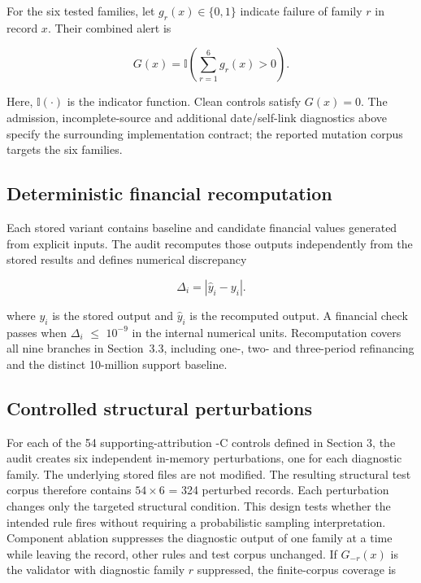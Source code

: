 \documentclass[11pt,a4paper]{article}
\begin{document}
For the six tested families, let $g_r(x)\in\{0,1\}$ indicate failure of family $r$ in record $x$. Their combined alert is

\begin{equation}\label{eq:validator}G(x)=\mathbb{I}\!\left(\sum_{r=1}^{6}g_r(x)>0\right).\end{equation}

Here, $\mathbb{I}(\cdot)$ is the indicator function. Clean controls satisfy $G(x)=0$. The admission, incomplete-source and additional date/self-link diagnostics above specify the surrounding implementation contract; the reported mutation corpus targets the six families.

\subsection{Deterministic financial recomputation}

Each stored variant contains baseline and candidate financial values generated from explicit inputs. The audit recomputes those outputs independently from the stored results and defines numerical discrepancy

\begin{equation}\label{eq:discrepancy}\Delta_i=\left|\widehat{y}_i-y_i\right|.\end{equation}

where $y_i$ is the stored output and $\widehat{y}_i$ is the recomputed output. A financial check passes when $\Delta_i$ $\leq$ $10^{-9}$ in the internal numerical units. Recomputation covers all nine branches in Section~3.3, including one-, two- and three-period refinancing and the distinct 10-million support baseline.

\subsection{Controlled structural perturbations}

For each of the 54 supporting-attribution -C controls defined in Section 3, the audit creates six independent in-memory perturbations, one for each diagnostic family. The underlying stored files are not modified. The resulting structural test corpus therefore contains $54\times 6$ = 324 perturbed records. Each perturbation changes only the targeted structural condition. This design tests whether the intended rule fires without requiring a probabilistic sampling interpretation. Component ablation suppresses the diagnostic output of one family at a time while leaving the record, other rules and test corpus unchanged. If $G_{-r}(x)$ is the validator with diagnostic family $r$ suppressed, the finite-corpus coverage is
\end{document}
